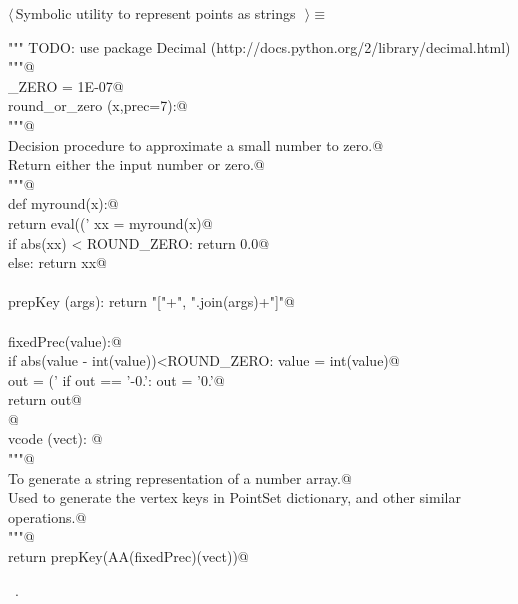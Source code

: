 \documentclass[11pt,oneside]{article}	%
\begin{document}
\begin{flushleft} \small \label{scrap27}
$\langle\,$Symbolic utility to represent points as strings\nobreak\ {\footnotesize {}}$\,\rangle\equiv$
\vspace{-1ex}
\begin{list}{}{} \item
\mbox{}\verb@""" TODO: use package Decimal (http://docs.python.org/2/library/decimal.html) """@\\
\mbox{}\verb@ROUND_ZERO = 1E-07@\\
\mbox{}\verb@def round_or_zero (x,prec=7):@\\
\mbox{}\verb@   """@\\
\mbox{}\verb@   Decision procedure to approximate a small number to zero.@\\
\mbox{}\verb@   Return either the input number or zero.@\\
\mbox{}\verb@   """@\\
\mbox{}\verb@   def myround(x):@\\
\mbox{}\verb@      return eval(('%.'+str(prec)+'f') % round(x,prec))@\\
\mbox{}\verb@   xx = myround(x)@\\
\mbox{}\verb@   if abs(xx) < ROUND_ZERO: return 0.0@\\
\mbox{}\verb@   else: return xx@\\
\mbox{}\verb@@\\
\mbox{}\verb@def prepKey (args): return "["+", ".join(args)+"]"@\\
\mbox{}\verb@@\\
\mbox{}\verb@def fixedPrec(value):@\\
\mbox{}\verb@   if abs(value - int(value))<ROUND_ZERO: value = int(value)@\\
\mbox{}\verb@   out = ('%0.7f'% value).rstrip('0')@\\
\mbox{}\verb@   if out == '-0.': out = '0.'@\\
\mbox{}\verb@   return out@\\
\mbox{}\verb@   @\\
\mbox{}\verb@def vcode (vect): @\\
\mbox{}\verb@   """@\\
\mbox{}\verb@   To generate a string representation of a number array.@\\
\mbox{}\verb@   Used to generate the vertex keys in PointSet dictionary, and other similar operations.@\\
\mbox{}\verb@   """@\\
\mbox{}\verb@   return prepKey(AA(fixedPrec)(vect))@\\
\mbox{}\verb@@{\NWsep}
\end{list}
\vspace{-1ex}
\footnotesize\addtolength{\baselineskip}{-1ex}
\begin{list}{}{\setlength{\itemsep}{-\parsep}\setlength{\itemindent}{-\leftmargin}}
\item \NWtxtMacroRefIn\ .
\end{list}
\end{flushleft}







\end{document}
